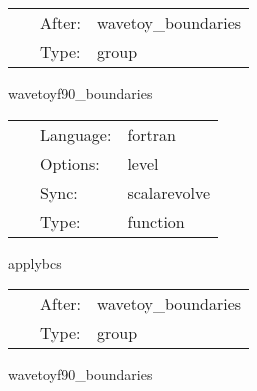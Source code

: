 \hspace{5mm}{\it apply boundary conditions } 


\hspace{5mm}

 \begin{tabular*}{160mm}{cll} 
~ & After:  & wavetoy\_boundaries \\ 
~ & Type:  & group \\ 
\end{tabular*} 


\vspace{5mm}


\hspace{5mm} wavetoyf90\_boundaries 

\hspace{5mm}{\it boundaries of 3d wave equation } 


\hspace{5mm}

 \begin{tabular*}{160mm}{cll} 
~ & Language:  & fortran \\ 
~ & Options:  & level \\ 
~ & Sync:  & scalarevolve \\ 
~ & Type:  & function \\ 
\end{tabular*} 


\vspace{5mm}


\hspace{5mm} applybcs 

\hspace{5mm}{\it apply boundary conditions } 


\hspace{5mm}

 \begin{tabular*}{160mm}{cll} 
~ & After:  & wavetoy\_boundaries \\ 
~ & Type:  & group \\ 
\end{tabular*} 


\vspace{5mm}


\hspace{5mm} wavetoyf90\_boundaries 

